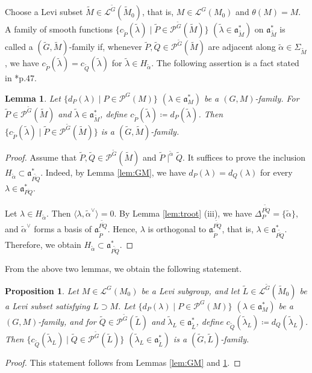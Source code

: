 \documentclass[12pt]{amsart}
\theoremstyle{definition}
\theoremstyle{plain}
\newtheorem{proposition}[definition]{Proposition}
\newtheorem{lemma}[definition]{Lemma}
\theoremstyle{remark}
\newcommand{\fa}{\mathfrak{a}}
\newcommand{\cL}{\mathcal{L}}
\newcommand{\cP}{\mathcal{P}}
\numberwithin{equation}{section}
\newcommand{\tG}{\widetilde{G}}
\newcommand{\tM}{\widetilde{M}}
\newcommand{\tL}{\widetilde{L}}
\newcommand{\tP}{\widetilde{P}}
\newcommand{\tQ}{\widetilde{Q}}
\newcommand{\talpha}{\widetilde{\alpha}}
\newcommand{\tlambda}{\widetilde{\lambda}}
\begin{document}
Choose a Levi subset $\tM\in \cL^{\tG}(\tM_0)$, that is, $M\in \cL^G(M_0)$ and $\theta(M)=M$. 
A family of smooth functions $\{c_{\tP}(\tlambda)\mid \tP\in\cP^{\tG}(\tM)\}$ 
$(\tlambda\in \fa_{\tM}^*)$ on $\fa_{\tM}^*$ is called a $(\tG,\tM)$-family if,
whenever $\tP, \tQ\in\cP^{\tG}(\tM)$ are adjacent along $\talpha\in\Sigma_{\tM}$, 
we have $c_{\tP}(\tlambda)=c_{\tQ}(\tlambda)$ for $\tlambda\in H_{\talpha}$.
The following assertion is a fact stated in \cite{LW13}*{p.47}.
\begin{lemma}\label{lem:tGtM}
Let $\{d_P(\lambda)\mid P\in\cP^G(M)\}$ $(\lambda\in \fa_M^*)$ be a $(G,M)$-family.
For $\tP\in\cP^{\tG}(\tM)$ and $\tlambda\in \fa_{\tM}^*$, define $c_{\tP}(\tlambda)\coloneqq d_P(\tlambda)$.
Then $\{c_{\tP}(\tlambda)\mid \tP\in\cP^{\tG}(\tM)\}$ is a $(\tG,\tM)$-family.
\end{lemma}
\begin{proof}
Assume that $\tP, \tQ \in \cP^{\tG}(\tM)$ and $\tP \mid^{\talpha} \tQ$. 
It suffices to prove the inclusion $H_{\talpha} \subset \fa_{\widetilde{\overline{PQ}}}^*$.
Indeed, by Lemma \ref{lem:GM}, we have $d_P(\lambda)=d_Q(\lambda)$ for every $\lambda\in\fa_{\overline{PQ}}^*$.

Let $\lambda \in H_{\talpha}$. 
Then $\langle \lambda, \talpha^\vee \rangle = 0$. 
By Lemma \ref{lem:troot} (iii), we have $\Delta_P^{\widetilde{\overline{PQ}}} = \{\talpha \}$, and $\talpha^\vee$ forms a basis of $\fa_{\tP}^{\widetilde{\overline{PQ}}}$. 
Hence, $\lambda$ is orthogonal to $\fa_{\tP}^{\widetilde{\overline{PQ}}}$, that is, $\lambda \in \fa_{\widetilde{\overline{PQ}}}^*$. 
Therefore, we obtain $H_{\talpha} \subset \fa_{\widetilde{\overline{PQ}}}^*$.
\end{proof}


From the above two lemmas, we obtain the following statement.
\begin{proposition}\label{prop:GM}
    Let $M\in\cL^G(M_0)$ be a Levi subgroup, and let $\tL\in \cL^{\tG}(\tM_0)$ be a Levi subset satisfying $L\supset M$. 
    Let $\{d_P(\lambda)\mid P\in\cP^G(M)\}$ $(\lambda\in \fa_M^*)$ be a $(G,M)$-family, and for $\tQ\in\cP^{\tG}(\tL)$ and $\tlambda_L\in \fa_{\tL}^*$, define $c_{\tQ}(\tlambda_L)\coloneqq d_Q(\tlambda_L)$.
    Then $\{c_{\tQ}(\tlambda_L)\mid \tQ\in\cP^{\tG}(\tL)\}$ $(\tlambda_L\in \fa_{\tL}^*)$ is a $(\tG,\tL)$-family.
\end{proposition}
\begin{proof}
    This statement follows from Lemmas \ref{lem:GM} and \ref{lem:tGtM}.
\end{proof}
\end{document}
